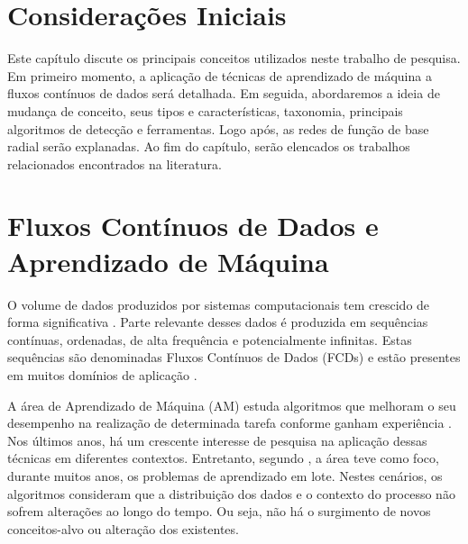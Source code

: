 \documentclass[qual, classic, a4paper]{ufbathesis}
\begin{document}
 \label{revisao_bibliografica}
\section{Considerações Iniciais}

Este capítulo discute os principais conceitos utilizados neste trabalho de pesquisa.
Em primeiro momento, a aplicação de técnicas de aprendizado de máquina a fluxos contínuos de dados será detalhada.
Em seguida, abordaremos a ideia de mudança de conceito, seus tipos e características, taxonomia, principais algoritmos de detecção e ferramentas.
Logo após, as redes de função de base radial serão explanadas.
Ao fim do capítulo, serão elencados os trabalhos relacionados encontrados na literatura.

\section{Fluxos Contínuos de Dados e Aprendizado de Máquina}

O volume de dados produzidos por sistemas computacionais tem crescido de forma significativa \cite{Cohen:BigData:2009:MSN:1687553.1687576}.
Parte relevante desses dados é produzida em sequências contínuas, ordenadas, de alta frequência e potencialmente infinitas.
Estas sequências são denominadas Fluxos Contínuos de Dados (FCDs) e estão presentes em muitos domínios de aplicação \cite{Aggarwal:2006:DSM:1196418}.



A área de Aprendizado de Máquina (AM) estuda algoritmos que melhoram o seu desempenho na realização de determinada tarefa conforme ganham experiência \cite{Mitchell:1997:ML:541177}.
Nos últimos anos, há um crescente interesse de pesquisa na aplicação dessas técnicas em diferentes contextos.
Entretanto, segundo \cite{Gama:2010:KDD:1855075}, a área teve como foco, durante muitos anos, os problemas de aprendizado em lote.
Nestes cenários, os algoritmos consideram que a distribuição dos dados e o contexto do processo não sofrem alterações ao longo do tempo.
Ou seja, não há o surgimento de novos conceitos-alvo ou alteração dos existentes.
\end{document}

